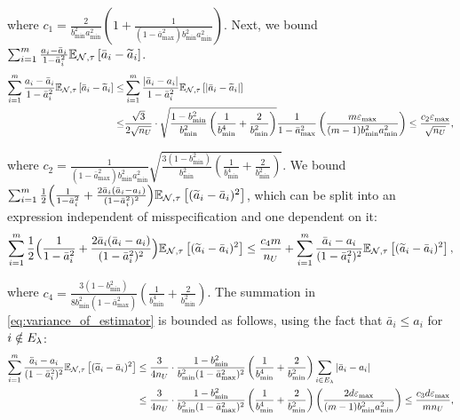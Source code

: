 where $c_1 = \frac{2}{b_{\min}^2 a_{\min}^2} \left(1 + \frac{1}{(1 - \bar{a}_{\max}^2) b_{\min}^2 a_{\min}^2} \right)$. Next, we bound $\sum_{i = 1}^m \frac{a_i - \bar{a}_i}{1 - \bar{a}_i^2} \mathbb{E}_{\mathcal{N}, \tau}\left[\bar{a}_i - \widetilde{a}_i\right]$.
\begin{align}
    \sum_{i = 1}^m \frac{a_i - \bar{a}_i}{1 - \bar{a}_i^2} \mathbb{E}_{\mathcal{N}, \tau}\left[\bar{a}_i - \widetilde{a}_i\right] \le &\sum_{i = 1}^m \frac{|\bar{a}_i - a_i|}{1 - \bar{a}_i^2} \mathbb{E}_{\mathcal{N}, \tau}\left[|\bar{a}_i - \widetilde{a}_i|\right] \\
    \le &\frac{\sqrt{3}}{2\sqrt{n_U}} \cdot \sqrt{\frac{1 - b_{\min}^2}{b_{\min}^2} \left(\frac{1}{b_{\min}^4} + \frac{2}{b_{\min}^2} \right)} \frac{1}{1 - \bar{a}_{\max}^2} \left(\frac{m \varepsilon_{\max}}{(m - 1) b_{\min}^2 a_{\min}^2}\right) \le \frac{c_2 \varepsilon_{\max}}{ \sqrt{n_U}},
\end{align}

where $c_2 = \frac{1}{(1 - \bar{a}_{\max}^2) b_{\min}^2 a_{\min}^2} \sqrt{\frac{3(1 - b_{\min}^2)}{b_{\min}^2} \left(\frac{1}{b_{\min}^4} + \frac{2}{b_{\min}^2} \right)}$. We bound $\sum_{i = 1}^m \frac{1}{2}\Big( \frac{1}{1 - \bar{a}_i^2} + \frac{2\bar{a}_i(\bar{a}_i - a_i)}{(1 - \bar{a}_i^2)^2}\Big) \mathbb{E}_{\mathcal{N}, \tau}\left[(\widetilde{a}_i - \bar{a}_i)^2\right]$, which can be split into an expression independent of misspecification and one dependent on it:
\begin{align}
    \sum_{i = 1}^m \frac{1}{2}\Big( \frac{1}{1 - \bar{a}_i^2} + \frac{2\bar{a}_i(\bar{a}_i - a_i)}{(1 - \bar{a}_i^2)^2}\Big) \mathbb{E}_{\mathcal{N}, \tau}\left[(\widetilde{a}_i - \bar{a}_i)^2\right] \le \frac{c_4 m}{n_U} + \sum_{i = 1}^m \frac{\bar{a}_i - a_i}{(1 - \bar{a}_i^2)^2} \mathbb{E}_{\mathcal{N}, \tau}\left[(\widetilde{a}_i - \bar{a}_i)^2\right], \label{eq:variance_of_estimator}
\end{align}

where $c_4 = \frac{3(1 - b_{\min}^2)}{8b_{\min}^2 (1 - \bar{a}_{\max}^2)} \left(\frac{1}{b_{\min}^4} + \frac{2}{b_{\min}^2} \right)$. The summation in \eqref{eq:variance_of_estimator} is bounded as follows, using the fact that $\bar{a}_i \le a_i$ for $i \notin E_{\lambda}$:
\begin{align}
    \sum_{i = 1}^m \frac{\bar{a}_i - a_i}{(1 - \bar{a}_i^2)^2} \mathbb{E}_{\mathcal{N}, \tau}\left[(\widetilde{a}_i - \bar{a}_i)^2\right] &\le \frac{3}{4 n_U} \cdot \frac{1 - b_{\min}^2}{b_{\min}^2 (1 - \bar{a}_{\max}^2)^2} \left(\frac{1}{b_{\min}^4} + \frac{2}{b_{\min}^2} \right) \sum_{i \in E_{\lambda}} |\bar{a}_i - a_i | \\
    &\le \frac{3}{4 n_U} \cdot \frac{1 - b_{\min}^2}{b_{\min}^2 (1 - \bar{a}_{\max}^2)^2} \left(\frac{1}{b_{\min}^4} + \frac{2}{b_{\min}^2} \right) \left(\frac{2d \varepsilon_{\max}}{(m - 1) b_{\min}^2 a_{\min}^2}\right) \le \frac{c_3 d \varepsilon_{\max}}{m n_U},
\end{align}

